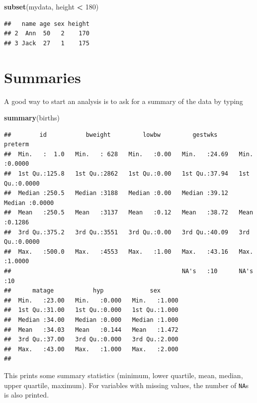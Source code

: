 \documentclass[
]{book}
\newenvironment{Shaded}{\begin{snugshade}}{\end{snugshade}}
\newcommand{\DecValTok}[1]{\textcolor[rgb]{0.00,0.00,0.81}{#1}}
\newcommand{\FunctionTok}[1]{\textcolor[rgb]{0.13,0.29,0.53}{\textbf{#1}}}
\newcommand{\NormalTok}[1]{#1}
\newcommand{\SpecialCharTok}[1]{\textcolor[rgb]{0.81,0.36,0.00}{\textbf{#1}}}
\begin{document}
\begin{Shaded}
\begin{Highlighting}[]
\FunctionTok{subset}\NormalTok{(mydata, height }\SpecialCharTok{\textless{}} \DecValTok{180}\NormalTok{)}
\end{Highlighting}
\end{Shaded}

\begin{verbatim}
##   name age sex height
## 2  Ann  50   2    170
## 3 Jack  27   1    175
\end{verbatim}

\section{Summaries}\label{summaries}

A good way to start an analysis is to ask for a
summary of the data by typing

\begin{Shaded}
\begin{Highlighting}[]
\FunctionTok{summary}\NormalTok{(births)}
\end{Highlighting}
\end{Shaded}

\begin{verbatim}
##        id           bweight         lowbw         gestwks         preterm      
##  Min.   :  1.0   Min.   : 628   Min.   :0.00   Min.   :24.69   Min.   :0.0000  
##  1st Qu.:125.8   1st Qu.:2862   1st Qu.:0.00   1st Qu.:37.94   1st Qu.:0.0000  
##  Median :250.5   Median :3188   Median :0.00   Median :39.12   Median :0.0000  
##  Mean   :250.5   Mean   :3137   Mean   :0.12   Mean   :38.72   Mean   :0.1286  
##  3rd Qu.:375.2   3rd Qu.:3551   3rd Qu.:0.00   3rd Qu.:40.09   3rd Qu.:0.0000  
##  Max.   :500.0   Max.   :4553   Max.   :1.00   Max.   :43.16   Max.   :1.0000  
##                                                NA's   :10      NA's   :10      
##      matage           hyp             sex       
##  Min.   :23.00   Min.   :0.000   Min.   :1.000  
##  1st Qu.:31.00   1st Qu.:0.000   1st Qu.:1.000  
##  Median :34.00   Median :0.000   Median :1.000  
##  Mean   :34.03   Mean   :0.144   Mean   :1.472  
##  3rd Qu.:37.00   3rd Qu.:0.000   3rd Qu.:2.000  
##  Max.   :43.00   Max.   :1.000   Max.   :2.000  
## 
\end{verbatim}

This prints some summary statistics (minimum, lower quartile, mean, median,
upper quartile, maximum). For variables with missing values, the number
of \texttt{NA}s is also printed.
\end{document}
